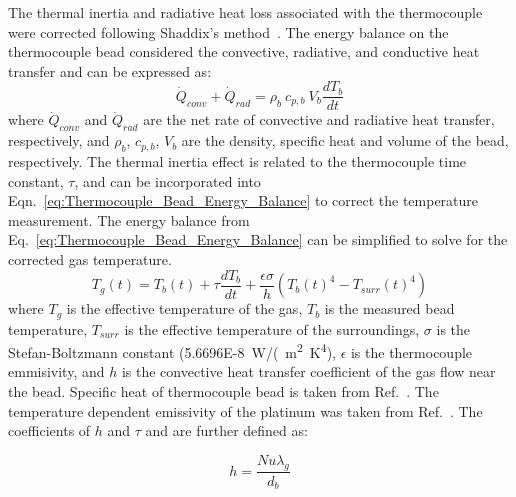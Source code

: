 \documentclass[12pt]{article}
\begin{document}
The thermal inertia and radiative heat loss associated with the thermocouple were corrected following Shaddix's method~\cite{Shaddix1999}. The energy balance on the thermocouple bead considered the convective, radiative, and conductive heat transfer and can be expressed as:
\begin{equation}\label{eq:Thermocouple_Bead_Energy_Balance}
{\dot{Q}_{conv}+\dot{Q}_{rad}}= \rho_{b}~c_{p,b}~V_{b}\frac{dT_{b}}{dt}
\end{equation}
where $\dot{Q}_{conv}$ and $\dot{Q}_{rad}$ are the net rate of convective and radiative heat transfer, respectively, and $\rho_{b}$, $c_{p,b}$, $V_{b}$ are the density, specific heat and volume of the bead, respectively. The thermal inertia effect is related to the thermocouple time constant, $\tau$, and can be incorporated into Eqn.~\ref{eq:Thermocouple_Bead_Energy_Balance} to correct the temperature measurement. The energy balance from Eq.~\ref{eq:Thermocouple_Bead_Energy_Balance} can be simplified to solve for the corrected gas temperature.
\begin{equation}\label{eq:Thermocouple_Bead_Correction}
{T_{g}(t)}= T_{b}(t)+\tau\frac{dT_{b}}{dt}+\frac{\epsilon\sigma}{h}\left({T_{b}(t)}^4-{T_{surr}(t)}^4\right)
\end{equation}
where $T_{g}$ is the effective temperature of the gas, $T_{b}$ is the measured bead temperature, $T_{surr}$ is the effective temperature of the surroundings, $\sigma$ is the Stefan-Boltzmann constant (\SI{5.6696E-8}{W/(m^2~K^4}), $\epsilon$ is the thermocouple emmisivity, and $h$ is the convective heat transfer coefficient of the gas flow near the bead. Specific heat of thermocouple bead is taken from Ref.~\cite{Jaeger1939}. The temperature dependent emissivity of the platinum was taken from Ref.~\cite{Incropera2007}. The coefficients of $h$ and $\tau$ and are further defined as:

\begin{equation}\label{eq:h_eqn}
h=\frac{Nu\lambda_{g}}{d_{b}}
\end{equation}
\end{document}

